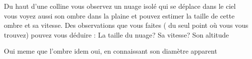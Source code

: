 \begin{Exercise}[title=Nuages]
	Du haut d'une colline vous observez un nuage isolé qui se déplace dans le ciel vous voyez aussi son ombre dans la plaine et pouvez estimer la taille de cette ombre et sa vitesse. Des observations que vous faites ( du seul point où vous vous trouvez) pouvez vous déduire :
	\Question La taille du nuage?
	\Question Sa vitesse?
	\Question Son altitude
\end{Exercise}
\begin{Answer}
	\Question Oui meme que l'ombre
	\Question idem
	\Question oui, en connaissant son diamètre apparent
\end{Answer}
